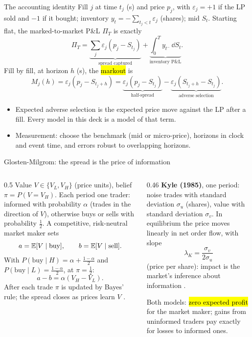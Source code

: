 \documentclass[aspectratio=169,10pt]{beamer}
\begin{document}
\begin{frame}{The accounting identity}
  \small
  Fill $j$ at time $t_j$ (s) and price $p_j$, with $\varepsilon_j = +1$ if the LP sold and $-1$ if it bought; inventory $y_t = -\sum_{t_j<t}\varepsilon_j$ (shares); mid $S_t$. Starting flat, the marked-to-market P\&L $\Pi_T$ is exactly
  \[ \Pi_T = \underbrace{\sum_j \varepsilon_j(p_j - S_{t_j})}_{\text{spread captured}} + \underbrace{\int_0^T y_{t^-}\,\dd S_t}_{\text{inventory P\&L}} . \]
  Fill by fill, at horizon $h$ (s), the \hl{markout} is
  \[ M_j(h) = \varepsilon_j(p_j - S_{t_j + h}) = \underbrace{\varepsilon_j(p_j - S_{t_j})}_{\text{half-spread}} - \underbrace{\varepsilon_j(S_{t_j + h} - S_{t_j})}_{\text{adverse selection}} . \]
  \begin{itemize}
    \item Expected adverse selection is the expected price move against the LP after a fill. Every model in this deck is a model of that term.
    \item Measurement: choose the benchmark (mid or micro-price), horizons in clock and event time, and errors robust to overlapping horizons.
  \end{itemize}
\end{frame}

\begin{frame}{Glosten-Milgrom: the spread is the price of information}
  \small
  \begin{columns}[T]
    \begin{column}{0.5\textwidth}
      Value $V \in \{V_L, V_H\}$ (price units), belief $\pi = P(V = V_H)$. Each period one trader: informed with probability $\alpha$ (trades in the direction of $V$), otherwise buys or sells with probability $\tfrac12$. A competitive, risk-neutral market maker sets
      \[ a = \mathbb{E}[V \mid \text{buy}], \qquad b = \mathbb{E}[V \mid \text{sell}] . \]
      With $P(\text{buy} \mid H) = \alpha + \tfrac{1-\alpha}{2}$ and $P(\text{buy} \mid L) = \tfrac{1-\alpha}{2}$, at $\pi = \tfrac12$:
      \[ a - b = \alpha(V_H - V_L) . \]
      After each trade $\pi$ is updated by Bayes' rule; the spread closes as prices learn $V$ \citep{glosten1985bid}.
    \end{column}
    \begin{column}{0.46\textwidth}
      \textbf{Kyle (1985)}, one period: noise trades with standard deviation $\sigma_u$ (shares), value with standard deviation $\sigma_v$. In equilibrium the price moves linearly in net order flow, with slope
      \[ \lambda_K = \frac{\sigma_v}{2\sigma_u} \]
      (price per share): impact is the market's inference about information \citep{kyle1985continuous}.

      \vspace{0.3em}
      Both models: \hl{zero expected profit} for the market maker; gains from uninformed traders pay exactly for losses to informed ones.
    \end{column}
  \end{columns}
\end{frame}
\end{document}
